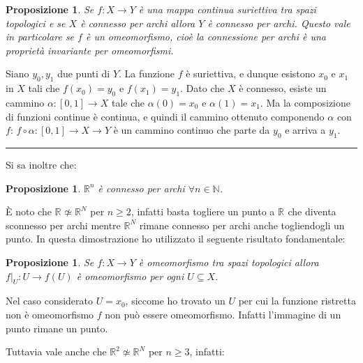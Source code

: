\documentclass[10pt, twoside=false, x11names]{scrbook}
\newtheorem{proposition}[theorem]{Proposizione}
\newenvironment{proof}{{\textbf{Dimostrazione}:}}{\hfill\rule{2mm}{2mm} \newline}
\newcommand{\RN}[1][]{\mathbb{R}^#1}
\begin{document}
\begin{proposition}
  Se $ f:X \to Y $ è una mappa continua suriettiva tra spazi topologici e se $ X $ è connesso per archi
  allora $ Y $ è connesso per archi. Questo vale in particolare se $ f $ è un omeomorfismo, cioè la
  connessione per archi è una proprietà invariante per omeomorfismi.
\end{proposition}

\begin{proof}
  Siano $ y_0, y_1 $ due punti di $ Y $. La funzione $ f $ è suriettiva, e dunque esistono $ x_0 $ e $ x_1 $ in $ X $
  tali che $ f(x_0)=y_0 $ e $ f(x_1)=y_1 $. Dato che $ X $ è connesso, esiste un cammino $ \alpha:[0,1] \to X $ tale che $ \alpha(0)=x_0 $
  e $ \alpha(1)=x_1 $. Ma la composizione di funzioni continue è continua, e quindi il cammino ottenuto componendo $ \alpha $ con $ f $:
  $ f \circ \alpha : [0,1] \to X \to Y $ è un cammino continuo che parte da $ y_0 $ e arriva a $ y_1 $.
\end{proof}

Si sa inoltre che:
\begin{proposition}
  $ \RN{n} $ è connesso per archi $ \forall n \in \mathbb{N} $.
\end{proposition}

È noto che $ \RN{} \not \simeq \RN{N} $ per $ n \geq 2 $, infatti basta togliere un punto a $ \RN{} $ che diventa sconnesso per archi
mentre $ \RN{N} $ rimane connesso per archi anche togliendogli un punto. In questa dimostrazione ho utilizzato
il seguente risultato fondamentale:
\begin{proposition}
  Se $ f: X \to Y $ è omeomorfismo tra spazi topologici allora $ f \rvert_U : U \to f(U) $ è omeomorfismo per ogni $ U \subseteq X $.
\end{proposition}
Nel caso considerato $ U = {x_0} $, siccome ho trovato un $ U $ per cui la funzione ristretta non è omeomorfismo $ f $
non può essere omeomorfismo. Infatti l'immagine di un punto rimane un punto.

Tuttavia vale anche che $ \RN{2} \not \simeq \RN{N} $ per $ n \geq 3 $, infatti:
\end{document}
